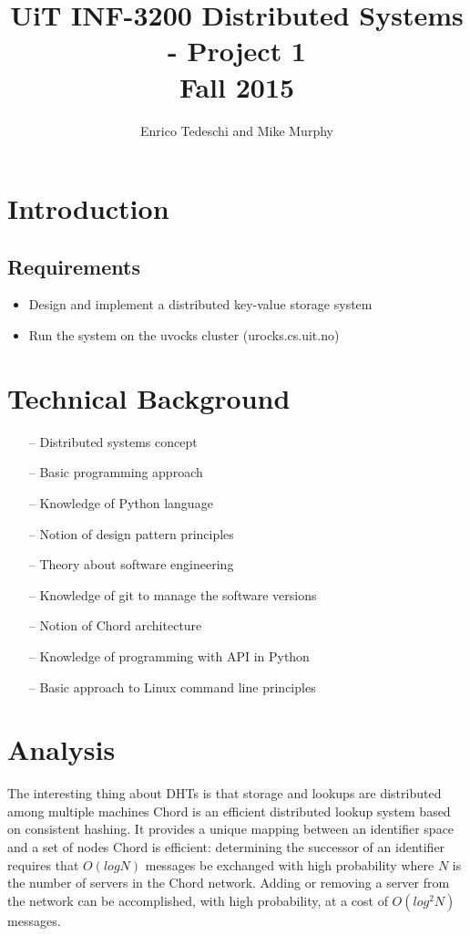 \documentclass[11pt,conference]{IEEEtran}
\title{UiT INF-3200 Distributed Systems - Project 1\\Fall 2015}
\author{Enrico Tedeschi and Mike Murphy}
\begin{document}
\maketitle


\section{Introduction}

\subsection{Requirements}
\begin{itemize} 
\item Design and implement a distributed key-value storage system
\item Run the system on the uvocks cluster (urocks.cs.uit.no)
\end{itemize}


\section{Technical Background}

\begin{itemize} 
\item[--] Distributed systems concept
\item[--] Basic programming approach
\item[--] Knowledge of Python language
\item[--] Notion of design pattern principles
\item[--] Theory about software engineering
\item[--] Knowledge of git to manage the software versions
\item[--] Notion of Chord architecture
\item[--] Knowledge of programming with API in Python
\item[--] Basic approach to Linux command line principles
\end{itemize}


\section{Analysis}
The interesting thing about DHTs is that storage and lookups are distributed among multiple machines \cite{citation1}
Chord is an efficient distributed lookup system based on consistent hashing. It provides a
unique mapping between an identifier space and a set of nodes \cite{citation2}
\newline
Chord is efficient: determining the successor of an identifier requires that $O(log N)$ messages be exchanged with high probability where $N$ is the number of servers in the
Chord network. Adding or removing a server from the network
can be accomplished, with high probability, at a cost of $O(log^2 N)$ messages. \cite{citation2}
\end{document}
